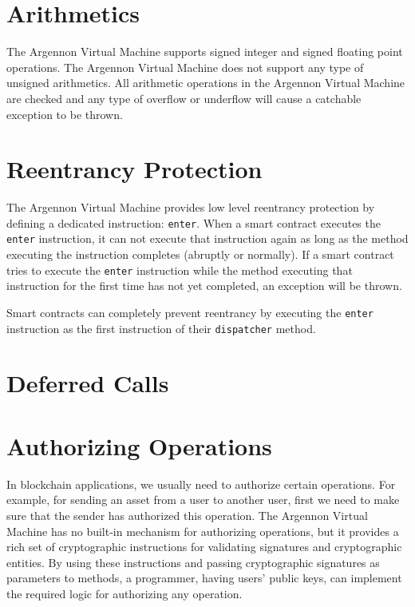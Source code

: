 \section{Arithmetics}\label{sec:arithmetics}

The Argennon Virtual Machine supports signed integer and signed floating point operations. The Argennon Virtual
Machine does not support any type of unsigned arithmetics. All arithmetic operations in the Argennon Virtual Machine
are checked and any type of overflow or underflow will cause a catchable exception to be thrown.


\section{Reentrancy Protection}\label{sec:reentrancy}

The Argennon Virtual Machine provides low level reentrancy protection by defining a dedicated
instruction: \texttt{enter}. When a smart contract executes the \texttt{enter} instruction, it
can not execute that instruction again as long
as the method executing the instruction completes (abruptly or normally). If a smart contract tries to execute
the \texttt{enter} instruction while the method executing that instruction for the first time has not yet completed,
an exception will be thrown.

Smart contracts can completely prevent reentrancy by executing the \texttt{enter} instruction as the first instruction
of their \texttt{dispatcher} method.


\section{Deferred Calls}\label{sec:deferred-calls}


\section{Authorizing Operations}\label{sec:authorizing-operations}

In blockchain applications, we usually need to authorize certain operations. For example, for sending an asset
from a user to another user, first we need to make sure that the sender has authorized this operation. The
Argennon Virtual Machine has no built-in mechanism for authorizing operations, but it provides a rich set of
cryptographic instructions for validating signatures and cryptographic entities. By using these instructions and
passing cryptographic signatures as parameters to methods, a programmer, having users' public keys, can implement
the required logic for authorizing any operation.

